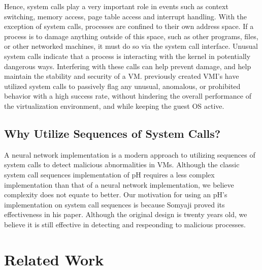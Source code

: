 \documentclass{report}
\begin{document}
\begin{spacing}{1.5}
{\large
Hence, system calls play a very important role in events such as context switching, memory access, page table access and interrupt handling. With the exception of system calls, processes are confined to their own address space. If a process is to damage anything outside of this space, such as other programs, files, or other networked machines, it must do so via the system call interface. Unusual system calls indicate that a process is interacting with the kernel in potentially dangerous ways. Interfering with these calls can help prevent damage, and help maintain the stability and security of a VM. previously created VMI's have utilized system calls to passively flag any unusual, anomalous, or prohibited behavior with a high success rate, without hindering the overall performance of the virtualization environment, and while keeping the guest OS active.
\newline
}







\subsection{Why Utilize Sequences of System Calls?}

{\large
A neural network implementation is a modern approach to utilizing sequences of system calls to detect malicious abnormalities in VMs. Although the classic system call sequences implementation of pH requires a less complex implementation than that of a neural network implementation, we believe complexity does not equate to better. Our motivation for using an pH's implementation on system call sequences is because Somyaji proved its effectiveness in his paper. Although the original design is twenty years old, we believe it is still effective in detecting and respeonding to malicious processes.
\newline
}

















\section{Related Work}


\end{spacing}
\end{document}
